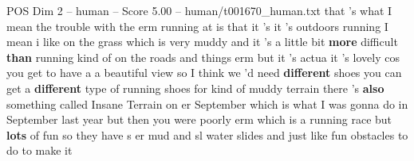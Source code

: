 \begin{textsample}{POS Dim 2 – human – Score 5.00 – human/t001670\_human.txt}  \label{ex:f2_pos_036}
that 's what I mean the trouble with the erm running at is that it 's it 's outdoors running I mean i like on the grass which is very muddy and it 's a little bit \textbf{more} difficult \textbf{than} running kind of on the roads and things erm but it 's actua it 's lovely cos you get to have a a beautiful view so I think we 'd need \textbf{different} shoes you can get a \textbf{different} type of running shoes for kind of muddy terrain there 's \textbf{also} something called Insane Terrain on er September which is what I was gonna do in September last year but then you were poorly erm which is a running race but \textbf{lots} of fun so they have s er mud and sl water slides and just like fun obstacles to do to make it

\end{textsample}
